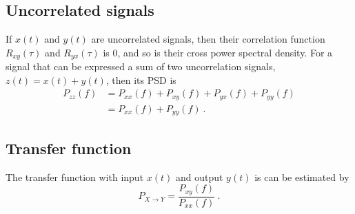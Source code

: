 \subsection{Uncorrelated signals}
If $x(t)$ and $y(t)$ are uncorrelated signals, then their correlation function $R_{xy}(\tau)$ and $R_{yx}(\tau)$ is 0, and so is their cross power spectral density.
For a signal that can be expressed a sum of two uncorrelation signals, $z(t)=x(t)+y(t)$, then its PSD is
\begin{equation}
	\begin{split}
		P_{zz}(f) &= P_{xx}(f) + P_{xy}(f) + P_{yx}(f) + P_{yy}(f)\\
		&= P_{xx}(f) + P_{yy}(f)\ .
	\end{split}
\end{equation}

\subsection{Transfer function}
The transfer function with input $x(t)$ and output $y(t)$ is can be estimated by
\begin{equation}
	P_{X\to Y} = \frac{P_{xy}(f)}{P_{xx}(f)}\ .
\end{equation}